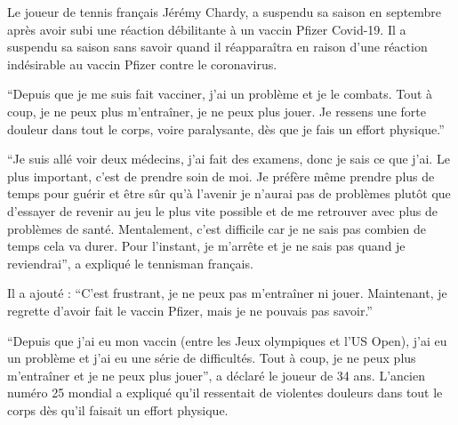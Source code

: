Le joueur de tennis français Jérémy Chardy, a suspendu sa saison en septembre
après avoir subi une réaction débilitante à un vaccin Pfizer Covid-19. Il a
suspendu sa saison sans savoir quand il réapparaîtra en raison d'une réaction
indésirable au vaccin Pfizer contre le coronavirus.

``Depuis que je me suis fait vacciner, j'ai un problème et je le combats. Tout à
coup, je ne peux plus m'entraîner, je ne peux plus jouer. Je ressens une forte
douleur dans tout le corps, voire paralysante, dès que je fais un effort
physique.''

``Je suis allé voir deux médecins, j'ai fait des examens, donc je sais ce que
j'ai. Le plus important, c'est de prendre soin de moi. Je préfère même prendre
plus de temps pour guérir et être sûr qu'à l'avenir je n'aurai pas de problèmes
plutôt que d'essayer de revenir au jeu le plus vite possible et de me retrouver
avec plus de problèmes de santé. Mentalement, c'est difficile car je ne sais pas
combien de temps cela va durer. Pour l'instant, je m'arrête et je ne sais pas
quand je reviendrai'', a expliqué le tennisman français.

Il a ajouté : ``C'est frustrant, je ne peux pas m'entraîner ni
jouer. Maintenant, je regrette d'avoir fait le vaccin Pfizer, mais je ne pouvais
pas savoir.''

``Depuis que j'ai eu mon vaccin (entre les Jeux olympiques et l'US Open), j'ai
eu un problème et j'ai eu une série de difficultés. Tout à coup, je ne peux plus
m'entraîner et je ne peux plus jouer'', a déclaré le joueur de 34 ans. L'ancien
numéro 25 mondial a expliqué qu'il ressentait de violentes douleurs dans tout le
corps dès qu'il faisait un effort physique.
